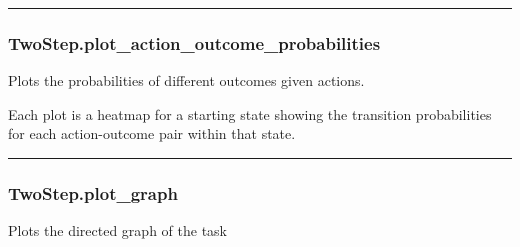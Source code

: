 \begin{center}\rule{0.5\linewidth}{\linethickness}\end{center}

\subsubsection{TwoStep.plot\_action\_outcome\_probabilities}\label{twostep.plot_action_outcome_probabilities}

\begin{Shaded}
\begin{Highlighting}[]
\OperatorTok{=}\OperatorTok{=}\OperatorTok{=}\OperatorTok{=}\NormalTok{)}
\end{Highlighting}
\end{Shaded}

Plots the probabilities of different outcomes given actions.

Each plot is a heatmap for a starting state showing the transition
probabilities for each action-outcome pair within that state.

\begin{center}\rule{0.5\linewidth}{\linethickness}\end{center}

\subsubsection{TwoStep.plot\_graph}\label{twostep.plot_graph}

\begin{Shaded}
\begin{Highlighting}[]
\OperatorTok{=}\OperatorTok{=}\OperatorTok{=}\OperatorTok{=}\OperatorTok{=}\OperatorTok{=}\OperatorTok{=}\OperatorTok{=}\NormalTok{)}
\end{Highlighting}
\end{Shaded}

Plots the directed graph of the task

